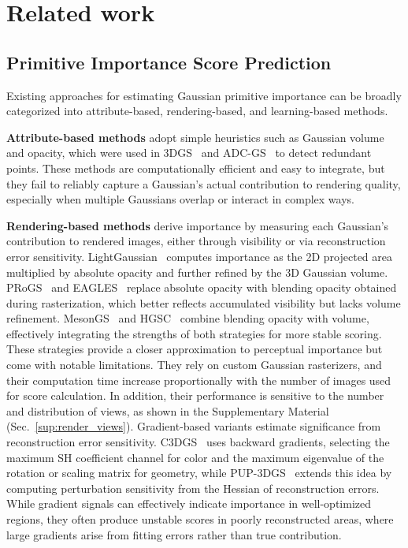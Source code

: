\section{Related work}
\label{sec:related}

\subsection{Primitive Importance Score Prediction}
\label{sec:related_method}
Existing approaches for estimating Gaussian primitive importance can be broadly categorized into attribute-based, rendering-based, and learning-based methods.

\textbf{Attribute-based methods} adopt simple heuristics such as Gaussian volume and opacity, which were used in 3DGS~\cite{3dgs} and ADC-GS~\cite{adc} to detect redundant points. These methods are computationally efficient and easy to integrate, but they fail to reliably capture a Gaussian’s actual contribution to rendering quality, especially when multiple Gaussians overlap or interact in complex ways.  

\textbf{Rendering-based methods} derive importance by measuring each Gaussian’s contribution to rendered images, either through visibility or via reconstruction error sensitivity.
LightGaussian~\cite{lightgaussian} computes importance as the 2D projected area multiplied by absolute opacity and further refined by the 3D Gaussian volume. 
PRoGS~\cite{progs} and EAGLES~\cite{eagles} replace absolute opacity with blending opacity obtained during rasterization, which better reflects accumulated visibility but lacks volume refinement. 
MesonGS~\cite{mesongs} and HGSC~\cite{HGSC} combine blending opacity with volume, effectively integrating the strengths of both strategies for more stable scoring.
These strategies provide a closer approximation to perceptual importance but come with notable limitations. 
They rely on custom Gaussian rasterizers, and their computation time increase proportionally with the number of images used for score calculation. 
In addition, their performance is sensitive to the number and distribution of views, as shown in the Supplementary Material (Sec.~\ref{sup:render_views}).
Gradient-based variants estimate significance from reconstruction error sensitivity. 
C3DGS~\cite{c3dgs} uses backward gradients, selecting the maximum SH coefficient channel for color and the maximum eigenvalue of the rotation or scaling matrix for geometry, while PUP-3DGS~\cite{pup} extends this idea by computing perturbation sensitivity from the Hessian of reconstruction errors. 
While gradient signals can effectively indicate importance in well-optimized regions, they often produce unstable scores in poorly reconstructed areas, where large gradients arise from fitting errors rather than true contribution.

